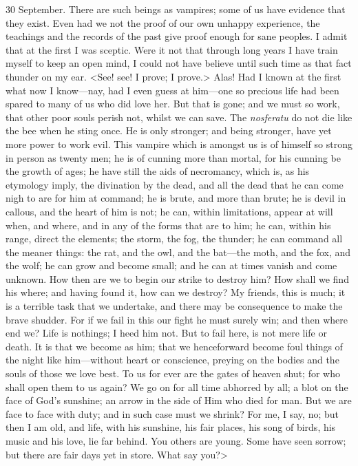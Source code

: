 \begin{diary}{30 September.}
There are such beings as vampires; some of us have evidence that they exist. Even had we not the proof of our own unhappy experience, the teachings and the records of the past give proof enough for sane peoples. I admit that at the first I was sceptic. Were it not that through long years I have train myself to keep an open mind, I could not have believe until such time as that fact thunder on my ear. <See! see! I prove; I prove.> Alas! Had I known at the first what now I know—nay, had I even guess at him—one so precious life had been spared to many of us who did love her. But that is gone; and we must so work, that other poor souls perish not, whilst we can save. The \textit{nosferatu} do not die like the bee when he sting once. He is only stronger; and being stronger, have yet more power to work evil. This vampire which is amongst us is of himself so strong in person as twenty men; he is of cunning more than mortal, for his cunning be the growth of ages; he have still the aids of necromancy, which is, as his etymology imply, the divination by the dead, and all the dead that he can come nigh to are for him at command; he is brute, and more than brute; he is devil in callous, and the heart of him is not; he can, within limitations, appear at will when, and where, and in any of the forms that are to him; he can, within his range, direct the elements; the storm, the fog, the thunder; he can command all the meaner things: the rat, and the owl, and the bat—the moth, and the fox, and the wolf; he can grow and become small; and he can at times vanish and come unknown. How then are we to begin our strike to destroy him? How shall we find his where; and having found it, how can we destroy? My friends, this is much; it is a terrible task that we undertake, and there may be consequence to make the brave shudder. For if we fail in this our fight he must surely win; and then where end we? Life is nothings; I heed him not. But to fail here, is not mere life or death. It is that we become as him; that we henceforward become foul things of the night like him—without heart or conscience, preying on the bodies and the souls of those we love best. To us for ever are the gates of heaven shut; for who shall open them to us again? We go on for all time abhorred by all; a blot on the face of God's sunshine; an arrow in the side of Him who died for man. But we are face to face with duty; and in such case must we shrink? For me, I say, no; but then I am old, and life, with his sunshine, his fair places, his song of birds, his music and his love, lie far behind. You others are young. Some have seen sorrow; but there are fair days yet in store. What say you?>


\end{diary}

